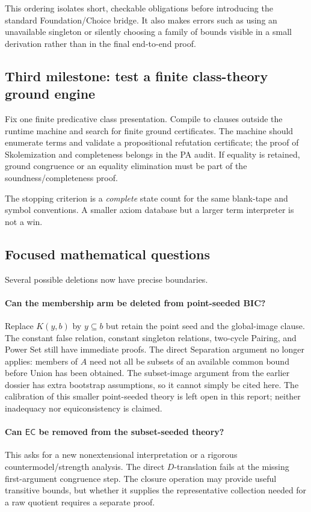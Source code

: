 \documentclass[11pt,letterpaper]{article}
\theoremstyle{definition}\newtheorem{definition}[theorem]{Definition}
\theoremstyle{remark}\newtheorem{remark}[theorem]{Remark}
\newcommand{\EC}{\mathsf{EC}}
\begin{document}
This ordering isolates short, checkable obligations before introducing
the standard Foundation/Choice bridge. It also makes errors such as
using an unavailable singleton or silently choosing a family of bounds
visible in a small derivation rather than in the final end-to-end proof.

\subsection{Third milestone: test a finite class-theory ground engine}

Fix one finite predicative class presentation. Compile to clauses
outside the runtime machine and search for finite ground certificates.
The machine should enumerate terms and validate a propositional
refutation certificate; the proof of Skolemization and completeness
belongs in the PA audit. If equality is retained, ground congruence or
an equality elimination must be part of the soundness/completeness proof.

The stopping criterion is a \emph{complete} state count for the same
blank-tape and symbol conventions. A smaller axiom database but a larger
term interpreter is not a win.

\subsection{Focused mathematical questions}

Several possible deletions now have precise boundaries.

\paragraph{Can the membership arm be deleted from point-seeded BIC?}
Replace $K(y,b)$ by $y\subseteq b$ but retain the point seed and the
global-image clause. The constant false relation, constant singleton
relations, two-cycle Pairing, and Power Set still have immediate
proofs. The direct Separation argument no longer applies: members of
$A$ need not all be subsets of an available common bound before Union
has been obtained. The subset-image argument from the earlier dossier
has extra bootstrap assumptions, so it cannot simply be cited here.
The calibration of this smaller point-seeded theory is left open in
this report; neither inadequacy nor equiconsistency is claimed.

\paragraph{Can $\EC$ be removed from the subset-seeded theory?}
This asks for a new nonextensional interpretation or a rigorous
countermodel/strength analysis. The direct $D$-translation fails at the
missing first-argument congruence step. The closure operation may provide
useful transitive bounds, but whether it supplies the representative
collection needed for a raw quotient requires a separate proof.
\end{document}
